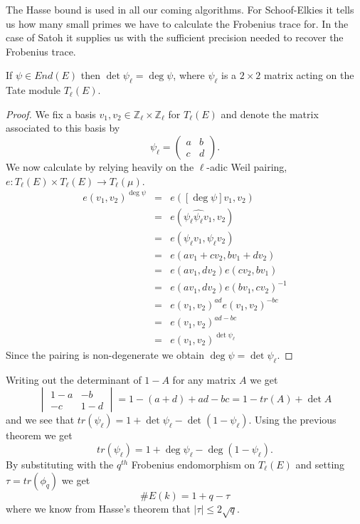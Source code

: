 The Hasse bound is used in all our coming algorithms. For Schoof-Elkies it tells us how many
small primes we have to calculate the Frobenius trace for. In the case of Satoh it supplies us
with the sufficient precision needed to recover the Frobenius trace.

\begin{prop} 
 If $\psi \in End(E)$ then $\det \psi_\ell = \deg\psi$, where $\psi_\ell$ is a $2\times2$ matrix acting
on the Tate module $T_\ell(E)$.
\label{detdeg}
\end{prop}
\begin{proof}
 We fix a basis $v_1,v_2 \in \mathbb{Z}_\ell \times \mathbb{Z}_\ell$ for $T_\ell(E)$ and denote the matrix
associated to this basis by
$$ \psi_\ell = \begin{pmatrix} a & b \\ c & d \end{pmatrix}. $$
We now calculate by relying heavily on the $\ell$-adic Weil pairing,
$e: T_\ell(E) \times T_\ell(E) \rightarrow T_\ell(\mu)$.
\begin{eqnarray}
 e(v_1, v_2)^{\deg\psi} &=& e([\deg \psi]v_1, v_2) \nonumber \\
			 &=& e(\psi_\ell \widehat{\psi_\ell} v_1, v_2) \nonumber \\
			 &=& e(\psi_\ell v_1, \psi_\ell v_2) \nonumber \\
			 &=& e(a v_1 + c v_2, b v_1 + d v_2) \nonumber \\
			 &=& e(a v_1, d v_2) e(c v_2, b v_1) \nonumber \\
			 &=& e(a v_1, d v_2) e(b v_1, c v_2)^{-1} \nonumber \\
			 &=& e(v_1, v_2)^{ad} e(v_1, v_2)^{-bc} \nonumber \\
			 &=& e(v_1, v_2)^{ad - bc} \nonumber \\
			 &=& e(v_1, v_2)^{\det \psi_\ell} \nonumber
\end{eqnarray}
Since the pairing is non-degenerate we obtain $\deg\psi = \det\psi_\ell$.
\end{proof}

Writing out the determinant of $1-A$ for any matrix $A$ we get
$$ \begin{vmatrix} 1-a & -b \\ -c & 1-d \end{vmatrix} = 1-(a+d)+ad-bc = 1-tr(A)+\det A $$
and we see that $tr(\psi_\ell) = 1 + \det \psi_\ell - \det(1-\psi_\ell)$. Using the previous theorem we
get $$tr(\psi_\ell) = 1 + \deg \psi_\ell - \deg(1-\psi_\ell).$$ By substituting with the $q^{th}$ 
Frobenius endomorphism on $T_\ell(E)$ and setting $\tau = tr(\phi_q)$ we get
$$\#E(k) = 1 + q - \tau$$
where we know from Hasse's theorem that $\lvert \tau \rvert \leq 2\sqrt{q}$.

